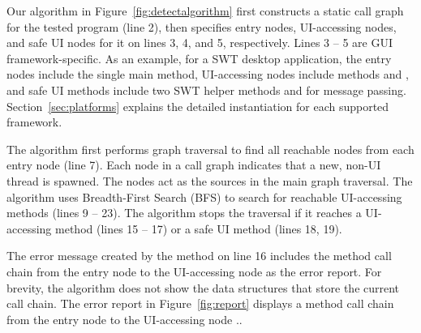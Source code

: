Our algorithm in Figure~\ref{fig:detectalgorithm} %
first constructs a static call graph for the tested program (line 2),
then specifies entry nodes, UI-accessing nodes, and safe UI nodes
for it on lines 3, 4, and 5, respectively. Lines 3 -- 5 are GUI framework-specific.
As an example, for a SWT desktop application, the entry nodes include
the single main method, UI-accessing nodes include methods
 and ,
and safe UI methods include two SWT helper methods   and
 for message passing. Section~\ref{sec:platforms}
explains the detailed instantiation for each supported framework.

The algorithm first performs graph traversal to find
all reachable 
nodes from each entry node (line 7).
Each  node in a call graph indicates that a new,
non-UI thread is spawned.  The 
nodes act as the sources in the main graph traversal.
The algorithm uses Breadth-First Search (BFS) to search for reachable UI-accessing
methods (lines 9 -- 23).
The algorithm stops the traversal if it reaches a UI-accessing
method (lines 15 -- 17) or a safe UI method (lines 18, 19).

The error message created by the method  on line 16
includes the method call chain from the entry node to the UI-accessing node
as the error report. For brevity, the algorithm does not show the data structures that store
the current call chain.
The error report in Figure~\ref{fig:report} displays a method call chain from the entry
node  to the UI-accessing node ..




